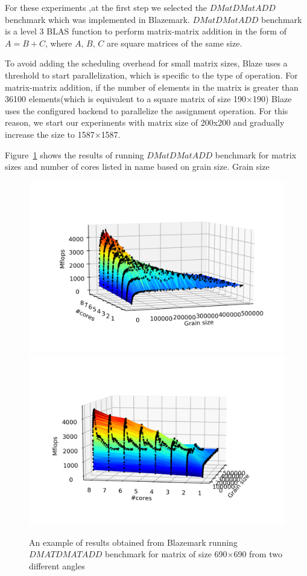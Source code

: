 For these experiments ,at the first step we selected the $DMatDMatADD$ benchmark which was implemented in Blazemark. $DMatDMatADD$ benchmark is a level 3 BLAS function to perform matrix-matrix addition in the form of $A=B+C$, where $A$, $B$, $C$ are square matrices of the same size. 

To avoid adding the scheduling overhead for small matrix sizes, Blaze uses a threshold to start parallelization, which is specific to the type of operation. For matrix-matrix addition, if the number of elements in the matrix is greater than 36100 elements(which is equivalent to a square matrix of size 190$\times$190) Blaze uses the configured backend to parallelize the assignment operation. For this reason, we start our experiments with matrix size of 200x200 and gradually increase the size to 1587$\times$1587. 


Figure~\ref{fig1} shows the results of running $DMatDMatADD$ benchmark for matrix sizes and number of cores listed in \tablename{name} based on grain size. Grain size 

\begin{figure}[H]
	\centering
	\includegraphics[width=1\linewidth]{images/fig2.png}
	\includegraphics[width=1\linewidth]{images/fig3.png}
	\caption{An example of results obtained from Blazemark running $DMATDMATADD$ benchmark for matrix of size 690$\times$690 from two different angles}	
	\label{fig1}
\end{figure}

